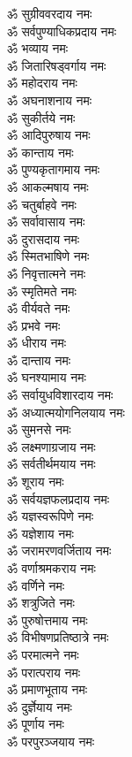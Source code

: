 \begin{multicols}{2}
\begin{flushleft}
ॐ सुग्रीववरदाय नमः\\
ॐ सर्वपुण्याधिकप्रदाय नमः\\
ॐ भव्याय नमः\\
ॐ जितारिषड्वर्गाय नमः\\
ॐ महोदराय नमः\hfill{}\\
ॐ अघनाशनाय नमः\\
ॐ सुकीर्तये नमः\\
ॐ आदिपुरुषाय नमः\\
ॐ कान्ताय नमः\\
ॐ पुण्यकृतागमाय नमः\\
ॐ आकल्मषाय नमः\\
ॐ चतुर्बाहवे नमः\\
ॐ सर्वावासाय नमः\\
ॐ दुरासदाय नमः\\
ॐ स्मितभाषिणे नमः\hfill{}\\
ॐ निवृत्तात्मने नमः\\
ॐ स्मृतिमते नमः\\
ॐ वीर्यवते नमः\\
ॐ प्रभवे नमः\\
ॐ धीराय नमः\\
ॐ दान्ताय नमः\\
ॐ घनश्यामाय नमः\\
ॐ सर्वायुधविशारदाय नमः\\
ॐ अध्यात्मयोगनिलयाय नमः\\
ॐ सुमनसे नमः\hfill{}\\
ॐ लक्ष्मणाग्रजाय नमः\\
ॐ सर्वतीर्थमयाय नमः\\
ॐ शूराय नमः\\
ॐ सर्वयज्ञफलप्रदाय नमः\\
ॐ यज्ञस्वरूपिणे नमः\\
ॐ यज्ञेशाय नमः\\
ॐ जरामरणवर्जिताय नमः\\
ॐ वर्णाश्रमकराय नमः\\
ॐ वर्णिने नमः\\
ॐ शत्रुजिते नमः\hfill{}\\
ॐ पुरुषोत्तमाय नमः\\
ॐ विभीषणप्रतिष्ठात्रे नमः\\
ॐ परमात्मने नमः\\
ॐ परात्पराय नमः\\
ॐ प्रमाणभूताय नमः\\
ॐ दुर्ज्ञेयाय नमः\\
ॐ पूर्णाय नमः\\
ॐ परपुरञ्जयाय नमः\\

\end{flushleft}
\end{multicols}
